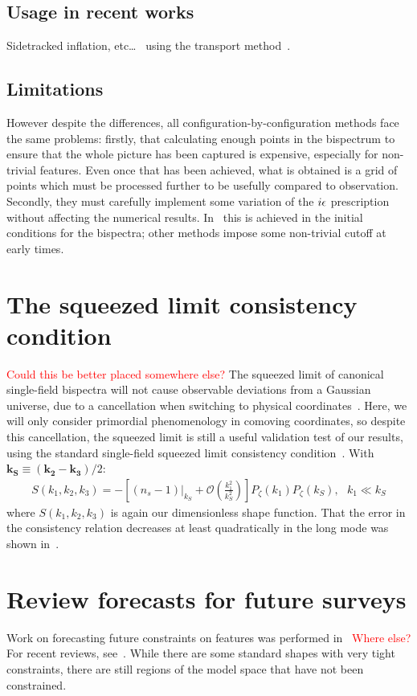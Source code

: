    \subsection{Usage in recent works}
    Sidetracked inflation, etc\ldots~\cite{Fumagalli_2019} using the transport method~\cite{transport_pytransport_2}.
    \subsection{Limitations}
    However despite the differences, all configuration-by-configuration methods face the same problems:
firstly, that calculating enough points in the bispectrum to ensure that
the whole picture has been captured is expensive, especially for non-trivial features.
Even once that has been achieved, what is obtained is a grid of points
which must be processed further to be usefully compared to observation.
Secondly, they must carefully implement some variation
of the $i\epsilon$ prescription without affecting the numerical results.
In~\cite{transport_main} this is achieved in the initial conditions for the bispectra;
other methods impose some non-trivial cutoff at early times.

    \section{The squeezed limit consistency condition}
    \textcolor{red}
    {Could this be better placed somewhere else?}
The squeezed limit of canonical single-field bispectra will not cause
observable deviations from a Gaussian universe,
due to a cancellation when switching to physical coordinates~\cite{Cabass_2016}.
Here, we will only consider primordial phenomenology
in comoving coordinates, so despite this cancellation,
the squeezed limit is still a useful validation test of our results,
using the standard single-field squeezed limit consistency condition~\cite{sqz_consistency,not_so_sqz}.
With $\mathbf{k_S}\equiv\left(\mathbf{k_2}-\mathbf{k_3}\right)/2 $:
\begin{align}\label{eq:sqz_consistency}
    S(k_1,k_2,k_3) = -\left[(n_s-1)|_{k_S}+\mathcal{O}\left(\frac{k_1^2}{k_S^2}\right)\right]P_{\zeta}(k_1)P_{\zeta}(k_S),
\ \ \  k_1\ll k_S
\end{align}
where $S(k_1,k_2,k_3)$ is again our dimensionless shape function.
That the error in the consistency relation decreases at least quadratically
in the long mode was shown in~\cite{not_so_sqz}.

    \section{Review forecasts for future surveys}
    Work on forecasting future constraints on features was performed
    in~\cite{Sohn_2019} \textcolor{red}{Where else?}
    For recent reviews, see~\cite{astro2020_png, astro2020_features}.
    While there are some standard shapes with very tight constraints,
    there are still regions of the model space that have not been constrained.
